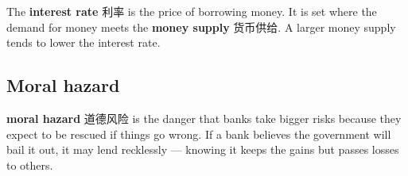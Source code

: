 \documentclass[11pt]{article}
\begin{document}
The \textbf{interest rate} 利率 is the price of borrowing money. It is set where the demand for money meets the \textbf{money supply} 货币供给. A larger money supply tends to lower the interest rate.

\subsection*{Moral hazard}

\textbf{moral hazard} 道德风险 is the danger that banks take bigger risks because they expect to be rescued if things go wrong. If a bank believes the government will bail it out, it may lend recklessly — knowing it keeps the gains but passes losses to others.
\end{document}
